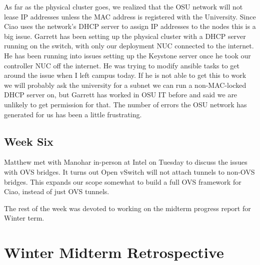 \documentclass[10pt,onecolumn,journal,draftclsnofoot]{IEEEtran}
\begin{document}
As far as the physical cluster goes, we realized that the OSU network will not
lease IP addresses unless the MAC address is registered with the University.
Since Ciao uses the network's DHCP server to assign IP addresses to the nodes
this is a big issue. Garrett has been setting up the physical cluster with a
DHCP server running on the switch, with only our deployment NUC connected to the
internet. He has been running into issues setting up the Keystone server once he
took our controller NUC off the internet. He was trying to modify ansible tasks
to get around the issue when I left campus today. If he is not able to get this
to work we will probably ask the university for a subnet we can run a
non-MAC-locked DHCP server on, but Garrett has worked in OSU IT before and said
we are unlikely to get permission for that. The number of errors the OSU network
has generated for us has been a little frustrating.

\subsection{Week Six}

Matthew met with Manohar in-person at Intel on Tuesday to discuss the issues
with OVS bridges. It turns out Open vSwitch will not attach tunnels to non-OVS
bridges. This expands our scope somewhat to build a full OVS framework for Ciao,
instead of just OVS tunnels.

The rest of the week was devoted to working on the midterm progress report for
Winter term.

\section{Winter Midterm Retrospective}
\end{document}
